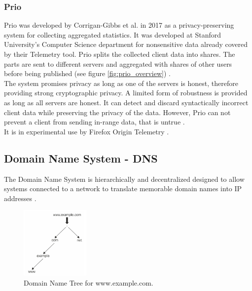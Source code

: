     \subsubsection{Prio}

        Prio was developed by Corrigan-Gibbs et al. \cite{corrigan-gibbs_prio_2017} in 2017 as a privacy-preserving system for collecting aggregated statistics.
        It was developed at Stanford University's Computer Science department for nonsensitive data already covered by their Telemetry tool. 
        Prio splits the collected client data into shares. 
        The parts are sent to different servers and aggregated with shares of other users before being published (see figure \ref{fig:prio_overview}) \cite{corrigan-gibbs_prio_2017}.\\
        The system promises privacy as long as one of the servers is honest, therefore providing strong cryptographic privacy. A limited form of robustness is provided as long as all servers are honest. It can detect and discard syntactically incorrect client data while preserving the privacy of the data. However, Prio can not prevent a client from sending in-range data, that is untrue \cite{corrigan-gibbs_prio_2017}.\\
        It is in experimental use by Firefox Origin Telemetry \cite{englehardt_next_2019}.
        
        
    \subsection{Domain Name System - DNS}
        \label{subsec:related:dns}
        The Domain Name System is hierarchically and decentralized designed to allow systems connected to a network to translate memorable domain names into IP addresses \cite{stevens_tcpip_1993}.\\
        
        \begin{figure}
            \includegraphics[width=0.3\textwidth]{latex/figures/domain_name_tree.jpg}
            \caption[Domain Name Tree for www.example.com.]{Domain Name Tree for www.example.com.  \cite{jeftovic_managing_2018}}
            \label{fig:dns_tree}
        \end{figure}
        
